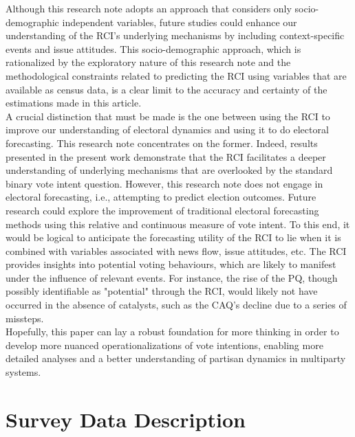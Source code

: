 \documentclass[
  journal=medium,
  manuscript=article-type,
  year=2024
]{cup-journal}
\begin{document}
Although this research note adopts an approach that considers only socio-demographic independent variables, future studies could enhance our understanding of the RCI's underlying mechanisms by including context-specific events and issue attitudes. This socio-demographic approach, which is rationalized by the exploratory nature of this research note and the methodological constraints related to predicting the RCI using variables that are available as census data, is a clear limit to the accuracy and certainty of the estimations made in this article. \\

A crucial distinction that must be made is the one between using the RCI to improve our understanding of electoral dynamics and using it to do electoral forecasting. This research note concentrates on the former. Indeed, results presented in the present work demonstrate that the RCI facilitates a deeper understanding of underlying mechanisms that are overlooked by the standard binary vote intent question. However, this research note does not engage in electoral forecasting, i.e., attempting to predict election outcomes. Future research could explore the improvement of traditional electoral forecasting methods \autocite{lewis-beck05} using this relative and continuous measure of vote intent. To this end, it would be logical to anticipate the forecasting utility of the RCI to lie when it is combined with variables associated with news flow, issue attitudes, etc. The RCI provides insights into potential voting behaviours, which are likely to manifest under the influence of relevant events. For instance, the rise of the PQ, though possibly identifiable as "potential" through the RCI, would likely not have occurred in the absence of catalysts, such as the CAQ's decline due to a series of missteps. \\

Hopefully, this paper can lay a robust foundation for more thinking in order to develop more nuanced operationalizations of vote intentions, enabling more detailed analyses and a better understanding of partisan dynamics in multiparty systems.

\printbibliography

\appendix

\newpage
\section{Survey Data Description}
\label{appendix:surveydata}
\end{document}
